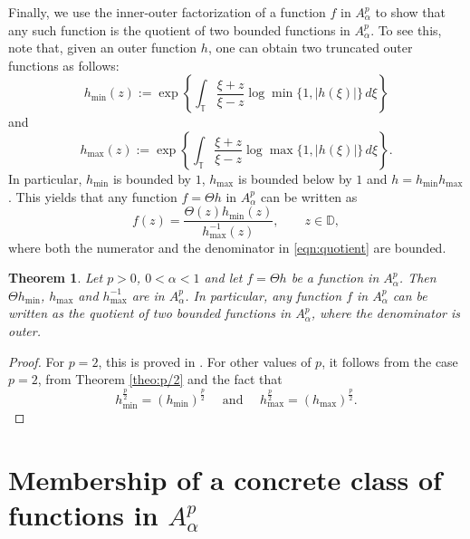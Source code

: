 \documentclass[12pt]{amsart}
\newtheorem{theorem}{Theorem}[section]
\theoremstyle{definition}
\newcommand{\T}{\mathbb{{T}}}
\newcommand{\D}{\mathbb{{D}}}
\numberwithin{equation}{section}
\begin{document}
        Finally, we use the inner-outer factorization of a function $f$ in $A^p_\alpha$ to show that any such function is the quotient of two bounded functions in $A^p_\alpha$. To see this, note that, given an outer function $h$, one can obtain two truncated outer functions as follows: 
            \[
                h_{\mathrm{min}}(z):=\exp\left\{\int_\T\frac{\xi+z}{\xi-z}\log\min\{1, |h(\xi)|\}\,d\xi\right\}
            \]
            and 
            \[
                h_{\mathrm{max}}(z):=\exp\left\{\int_\T\frac{\xi+z}{\xi-z}\log\max\{1, |h(\xi)|\}\,d\xi\right\}.
            \]
            In particular, $h_{\mathrm{min}}$ is bounded by $1$, $h_{\mathrm{max}}$ is bounded below by $1$ and $h=h_{\mathrm{min}}h_{\mathrm{max}}$. This yields that any function $f=\Theta h$ in $A^p_\alpha$ can be written as 
            \begin{equation}
            \label{eqn:quotient}
                f(z)=\frac{\Theta(z)h_{\mathrm{min}}(z)}{h^{-1}_\mathrm{max}(z)}, \qquad z\in\D,
            \end{equation}
            where both the numerator and the denominator in \eqref{eqn:quotient} are bounded.
            
        \begin{theorem}
            \label{theo:quotient}
            Let $p>0$, $0<\alpha<1$ and let $f=\Theta h$ be a function in $A^p_\alpha$. Then $\Theta h_\mathrm{min}$,  $h_\mathrm{max}$ and $h^{-1}_\mathrm{max}$ are in $A^p_\alpha$. In particular, any function $f$ in $A^p_\alpha$ can be written as the quotient of two bounded functions in $A^p_\alpha$, where the denominator is outer.
        \end{theorem}
        
        \begin{proof}
            For $p=2$, this is proved in \cite[Thm. 3.3, 3.4]{Boe03}. For other values of $p$, it follows from the case $p=2$, from Theorem \ref{theo:p/2} and the fact that 
            \[
                h_\mathrm{min}^\frac{p}{2}=\left(h_\mathrm{min}\right)^\frac{p}{2}\quad \mbox{ and } \quad h_\mathrm{max}^\frac{p}{2}=\left(h_\mathrm{max}\right)^\frac{p}{2}.
            \]
        \end{proof}

    \section{Membership of a concrete class of functions in $A^p_\alpha$}
    \label{sec:NonLinear}
\end{document}
